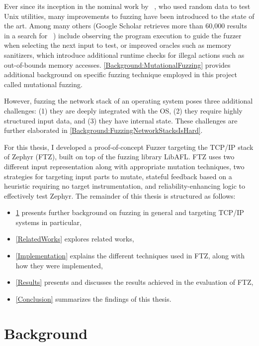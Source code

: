 \documentclass[twocolumn]{article}
\newcommand{\proj}{FTZ\xspace}
\let\savedCite=\cite
\renewcommand{\cite}{\unskip~\savedCite}
\begin{document}
Ever since its inception in the nominal work by \citeauthor{UNIX}\cite{UNIX}, who used random data to test Unix utilities, many improvements to fuzzing have been introduced to the state of the art. Among many others (Google Scholar retrieves more than 60,000 results in a search for \cite{GoogleScholarFuzzing}) include observing the program execution to guide the fuzzer when selecting the next input to test, or improved oracles such as memory sanitizers, which introduce additional runtime checks for illegal actions such as out-of-bounds memory accesses. \cref{Background:MutationalFuzzing} provides additional background on specific fuzzing technique employed in this project called mutational fuzzing.

However, fuzzing the network stack of an operating system poses three additional challenges: (1) they are deeply integrated with the OS, (2) they require highly structured input data, and (3) they have internal state. These challenges are further elaborated in \cref{Background:FuzzingNetworkStacksIsHard}.

For this thesis, I developed a proof-of-concept Fuzzer targeting the TCP/IP stack of Zephyr (\proj), built on top of the fuzzing library LibAFL. \proj uses two different input representation along with appropriate mutation techniques, two strategies for targeting input parts to mutate, stateful feedback based on a heuristic requiring no target instrumentation, and reliability-enhancing logic to effectively test Zephyr. The remainder of this thesis is structured as follows:

\begin{itemize}
  \item \cref{Background} presents further background on fuzzing in general and targeting TCP/IP systems in particular,
  \item \cref{RelatedWorks} explores related works,
  \item \cref{Implementation} explains the different techniques used in \proj, along with how they were implemented,
  \item \cref{Results} presents and discusses the results achieved in the evaluation of \proj,
  \item \cref{Conclusion} summarizes the findings of this thesis.
\end{itemize}


\section{Background}
\label{Background}
\end{document}

